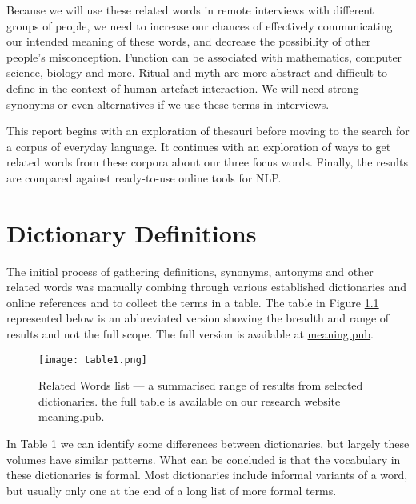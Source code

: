 \documentclass[12pt, usenames, dvipsnames]{report}
\begin{document}
\begin{flushleft}
Because we will use these related words in remote interviews with different groups of people, we need to increase our chances of effectively communicating our intended meaning of these words, and decrease the possibility of other people’s misconception.
Function can be associated with mathematics, computer science, biology and more.
Ritual and myth are more abstract and difficult to define in the context of human-artefact interaction.
We will need strong synonyms or even alternatives if we use these terms in interviews.

This report begins with an exploration of thesauri before moving to the search for a corpus of everyday language.
It continues with an exploration of ways to get related words from these corpora about our three focus words.
Finally, the results are compared against ready-to-use online tools for NLP.


\chapter{Dictionary Definitions}

The initial process of gathering definitions, synonyms, antonyms and other related words was manually combing through various established dictionaries and online references and to collect the terms in a table.
The table in Figure \ref{fig:table1} represented below is an abbreviated version showing the breadth and range of results and not the full scope.
The full version is available at \href{https://meaning.pub.}{meaning.pub}.

\vspace*{1.2em}
\begin{figure}[!htbp]
  \hspace*{-3.666em}
  \texttt{[image: table1.png]}
  \caption{Related Words list --- a summarised range of results from selected dictionaries. the full table is available on our research website \href{https://meaning.pub.}{meaning.pub}.}
  \label{fig:table1}
\end{figure}
\vspace*{1.2em}

In Table 1 we can identify some differences between dictionaries, but largely these volumes have similar patterns.
What can be concluded is that the vocabulary in these dictionaries is formal.
Most dictionaries include informal variants of a word, but usually only one at the end of a long list of more formal terms.


\end{flushleft}
\end{document}
